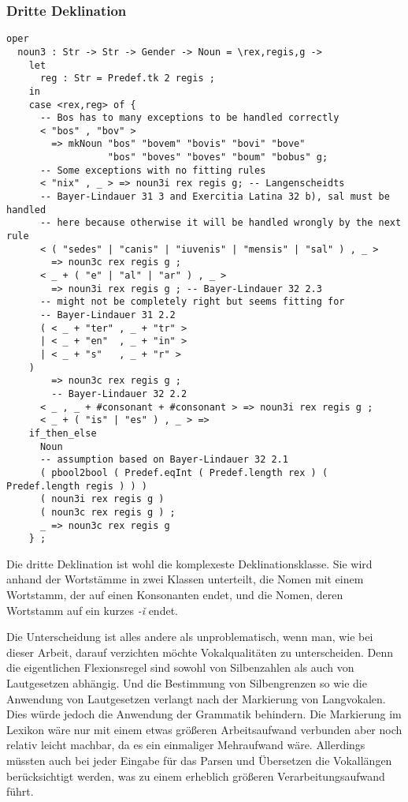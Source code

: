\subsubsection{Dritte Deklination}
\begin{lstlisting}[float=h!tp,caption={Funktion zur Zuordnung von Nomen zu den Stämmen der dritten Deklination (vgl. \textbf{MorphoLat.gf})},label={GF-Morpho-Noun3},basicstyle=\small]
oper
  noun3 : Str -> Str -> Gender -> Noun = \rex,regis,g ->
    let
      reg : Str = Predef.tk 2 regis ;
    in
    case <rex,reg> of {
      -- Bos has to many exceptions to be handled correctly
      < "bos" , "bov" > 
        => mkNoun "bos" "bovem" "bovis" "bovi" "bove" 
                  "bos" "boves" "boves" "boum" "bobus" g;
      -- Some exceptions with no fitting rules
      < "nix" , _ > => noun3i rex regis g; -- Langenscheidts
      -- Bayer-Lindauer 31 3 and Exercitia Latina 32 b), sal must be handled 
      -- here because otherwise it will be handled wrongly by the next rule 
      < ( "sedes" | "canis" | "iuvenis" | "mensis" | "sal" ) , _ > 
        => noun3c rex regis g ;  
      < _ + ( "e" | "al" | "ar" ) , _ > 
        => noun3i rex regis g ; -- Bayer-Lindauer 32 2.3
      -- might not be completely right but seems fitting for 
      -- Bayer-Lindauer 31 2.2 
      ( < _ + "ter" , _ + "tr" >
      | < _ + "en"  , _ + "in" >
      | < _ + "s"   , _ + "r" > 
	) 
        => noun3c rex regis g ; 
        -- Bayer-Lindauer 32 2.2
      < _ , _ + #consonant + #consonant > => noun3i rex regis g ; 
      < _ + ( "is" | "es" ) , _ > => 
	if_then_else 
	  Noun 
	  -- assumption based on Bayer-Lindauer 32 2.1
	  ( pbool2bool ( Predef.eqInt ( Predef.length rex ) ( Predef.length regis ) ) ) 
	  ( noun3i rex regis g ) 
	  ( noun3c rex regis g ) ;
      _ => noun3c rex regis g
    } ;
\end{lstlisting}
Die dritte Deklination ist wohl die komplexeste Deklinationsklasse. Sie wird anhand der Wortstämme in zwei Klassen unterteilt, die Nomen mit einem Wortstamm, der auf einen Konsonanten endet, und die Nomen, deren Wortstamm auf ein kurzes \textit{-ǐ} endet. \par
Die Unterscheidung ist alles andere als unproblematisch, wenn man, wie bei dieser Arbeit, darauf verzichten möchte Vokalqualitäten zu unterscheiden. Denn die eigentlichen Flexionsregel sind sowohl von Silbenzahlen als auch von Lautgesetzen abhängig. Und die Bestimmung von Silbengrenzen so wie die Anwendung von Lautgesetzen verlangt nach der Markierung von Langvokalen. Dies würde jedoch die Anwendung der Grammatik behindern. Die Markierung im Lexikon wäre nur mit einem etwas größeren Arbeitsaufwand verbunden aber noch relativ leicht machbar, da es ein einmaliger Mehraufwand wäre. Allerdings müssten auch bei jeder Eingabe für das Parsen und Übersetzen die Vokallängen berücksichtigt werden, was zu einem erheblich größeren Verarbeitungsaufwand führt. \par
